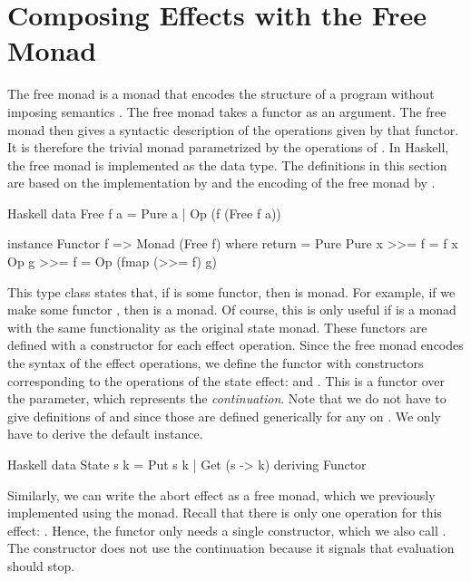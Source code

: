 \section{Composing Effects with the Free Monad}

The free monad is a monad that encodes the structure of a program without imposing semantics \autocite{swierstra_data_2008}. The free monad takes a functor  as an argument. The free monad then gives a syntactic description of the operations given by that functor. It is therefore the trivial monad parametrized by the operations of . In Haskell, the free monad is implemented as the  data type. The definitions in this section are based on the implementation by \textcite{kammar_handlers_2013} and the encoding of the free monad by \textcite{bach_poulsen_hefty_2023}.

\begin{lst}{Haskell}
data Free f a
  = Pure a
  | Op (f (Free f a))

instance Functor f => Monad (Free f) where
  return = Pure
  Pure x >>= f = f x
  Op g >>= f = Op (fmap (>>= f) g)
\end{lst}
%
This type class states that, if  is some functor, then  is monad. For example, if we make some functor , then  is a monad. Of course, this is only useful if  is a monad with the same functionality as the original state monad. These functors are defined with a constructor for each effect operation. Since the free monad encodes the syntax of the effect operations, we define the  functor with constructors corresponding to the operations of the state effect:  and . This is a functor over the  parameter, which represents the \emph{continuation}. Note that we do not have to give definitions of  and \hs{>>=} since those are defined generically for any  on . We only have to derive the default  instance.

\begin{lst}{Haskell}
data State s k = Put s k | Get (s -> k)
  deriving Functor
\end{lst}
%
Similarly, we can write the abort effect as a free monad, which we previously implemented using the  monad. Recall that there is only one operation for this effect: . Hence, the  functor only needs a single constructor, which we also call . The  constructor does not use the continuation because it signals that evaluation should stop.

